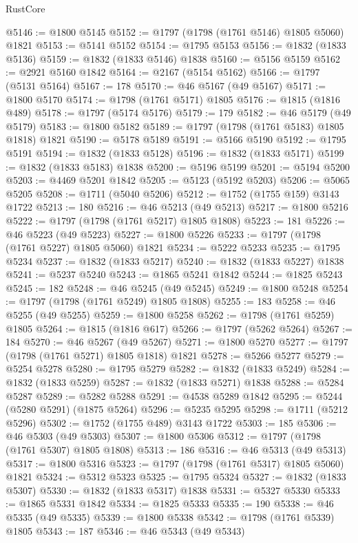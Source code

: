\begin{lexlean}{RustCore}
\begin{coremodule}
@5146 := @1800 @5145
@5152 := @1797 (@1798 (@1761 @5146) @1805 @5060) @1821
@5153 := @5141 @5152
@5154 := @1795 @5153
@5156 := @1832 (@1833 @5136)
@5159 := @1832 (@1833 @5146) @1838
@5160 := @5156 @5159
@5162 := @2921 @5160 @1842
@5164 := @2167 (@5154 @5162)
@5166 := @1797 (@5131 @5164)
@5167 := 178
@5170 := @46 @5167 (@49 @5167)
@5171 := @1800 @5170
@5174 := @1798 (@1761 @5171) @1805
@5176 := @1815 (@1816 @489)
@5178 := @1797 (@5174 @5176)
@5179 := 179
@5182 := @46 @5179 (@49 @5179)
@5183 := @1800 @5182
@5189 := @1797 (@1798 (@1761 @5183) @1805 @1818) @1821
@5190 := @5178 @5189
@5191 := @5166 @5190
@5192 := @1795 @5191
@5194 := @1832 (@1833 @5128)
@5196 := @1832 (@1833 @5171)
@5199 := @1832 (@1833 @5183) @1838
@5200 := @5196 @5199
@5201 := @5194 @5200
@5203 := @4469 @5201 @1842
@5205 := @5123 (@5192 @5203)
@5206 := @5065 @5205
@5208 := @1711 (@5040 @5206)
@5212 := @1752 (@1755 @159) @3143 @1722
@5213 := 180
@5216 := @46 @5213 (@49 @5213)
@5217 := @1800 @5216
@5222 := @1797 (@1798 (@1761 @5217) @1805 @1808)
@5223 := 181
@5226 := @46 @5223 (@49 @5223)
@5227 := @1800 @5226
@5233 := @1797 (@1798 (@1761 @5227) @1805 @5060) @1821
@5234 := @5222 @5233
@5235 := @1795 @5234
@5237 := @1832 (@1833 @5217)
@5240 := @1832 (@1833 @5227) @1838
@5241 := @5237 @5240
@5243 := @1865 @5241 @1842
@5244 := @1825 @5243
@5245 := 182
@5248 := @46 @5245 (@49 @5245)
@5249 := @1800 @5248
@5254 := @1797 (@1798 (@1761 @5249) @1805 @1808)
@5255 := 183
@5258 := @46 @5255 (@49 @5255)
@5259 := @1800 @5258
@5262 := @1798 (@1761 @5259) @1805
@5264 := @1815 (@1816 @617)
@5266 := @1797 (@5262 @5264)
@5267 := 184
@5270 := @46 @5267 (@49 @5267)
@5271 := @1800 @5270
@5277 := @1797 (@1798 (@1761 @5271) @1805 @1818) @1821
@5278 := @5266 @5277
@5279 := @5254 @5278
@5280 := @1795 @5279
@5282 := @1832 (@1833 @5249)
@5284 := @1832 (@1833 @5259)
@5287 := @1832 (@1833 @5271) @1838
@5288 := @5284 @5287
@5289 := @5282 @5288
@5291 := @4538 @5289 @1842
@5295 := @5244 (@5280 @5291) (@1875 @5264)
@5296 := @5235 @5295
@5298 := @1711 (@5212 @5296)
@5302 := @1752 (@1755 @489) @3143 @1722
@5303 := 185
@5306 := @46 @5303 (@49 @5303)
@5307 := @1800 @5306
@5312 := @1797 (@1798 (@1761 @5307) @1805 @1808)
@5313 := 186
@5316 := @46 @5313 (@49 @5313)
@5317 := @1800 @5316
@5323 := @1797 (@1798 (@1761 @5317) @1805 @5060) @1821
@5324 := @5312 @5323
@5325 := @1795 @5324
@5327 := @1832 (@1833 @5307)
@5330 := @1832 (@1833 @5317) @1838
@5331 := @5327 @5330
@5333 := @1865 @5331 @1842
@5334 := @1825 @5333
@5335 := 190
@5338 := @46 @5335 (@49 @5335)
@5339 := @1800 @5338
@5342 := @1798 (@1761 @5339) @1805
@5343 := 187
@5346 := @46 @5343 (@49 @5343)

\end{coremodule}
\end{lexlean}
